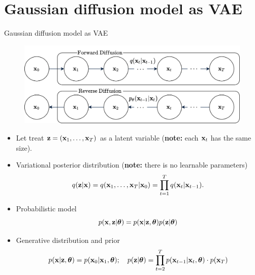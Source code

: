 \section{Gaussian diffusion model as VAE}
\begin{frame}{Gaussian diffusion model as VAE}
	\vspace{-0.2cm}
	\begin{figure}
		\includegraphics[width=0.65\linewidth]{figs/diffusion_pgm}
	\end{figure}
	\begin{itemize}
		\item Let treat $\mathbf{z} = (\mathbf{x}_1, \dots, \mathbf{x}_T)$ as a latent variable (\textbf{note:} each $\mathbf{x}_t$ has the same size).
		\item Variational posterior distribution (\textbf{note:} there is no learnable parameters)
		\vspace{-0.4cm}
		\[
			q(\mathbf{z} | \mathbf{x}) = q(\mathbf{x}_1, \dots, \mathbf{x}_T | \mathbf{x}_0) = \prod_{t = 1}^T q(\mathbf{x}_t | \mathbf{x}_{t - 1}).
		\]
		\vspace{-0.5cm}
		\item Probabilistic model
		\vspace{-0.2cm}
		\[
			p(\mathbf{x}, \mathbf{z} | \boldsymbol{\theta}) = p(\mathbf{x} | \mathbf{z}, \boldsymbol{\theta}) p(\mathbf{z} | \boldsymbol{\theta})
		\]
		\item Generative distribution and prior
		\vspace{-0.3cm}
		\[
			p(\mathbf{x} | \mathbf{z}, \boldsymbol{\theta}) = p(\mathbf{x}_0 | \mathbf{x}_1, \boldsymbol{\theta}); \quad 
			p(\mathbf{z} | \boldsymbol{\theta}) = \prod_{t=2}^T p(\mathbf{x}_{t - 1} | \mathbf{x}_t, \boldsymbol{\theta})  \cdot p(\mathbf{x}_T)
		\]
	\end{itemize}
\end{frame}
